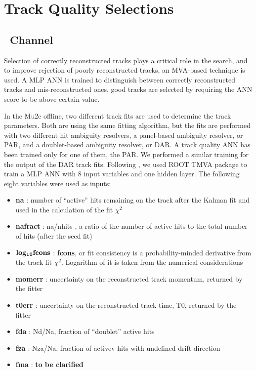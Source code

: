 

\section{Track Quality Selections}

\subsection{\MuToEm\  Channel}
\label{sec:mumem_channel}

Selection of correctly reconstructed tracks plays a critical role in the search, and 
to improve rejection of poorly reconstructed  tracks, an MVA-based technique is used.
A MLP ANN is trained to distinguish between correctly reconstructed tracks
and mis-reconstructed ones, good tracks are selected by requiring the ANN score to be
above certain value.

In the Mu2e offline, two different track fits are used to determine the track parameters.
Both are using the same fitting algorithm, but the fits are performed with two different
hit ambiguity resolvers, a panel-based ambiguity resolver, or PAR, and a doublet-based
ambiguity resolver, or DAR. A track quality ANN has been trained only for one of them,
the PAR. 
%
We performed a similar training for the output of the DAR track fits.
%
Following \cite{MU2E_4595_ANN_TRAINING}, we used ROOT TMVA package to train a MLP ANN
with 8 input variables and one hidden layer. The following eight variables were used
as inputs:

\begin{itemize}
\item
  {\bf na } : number of ``active'' hits remaining on the track after the Kalman fit and used
  in the calculation of the fit $\chi^2$
\item
  {\bf nafract} : na/nhits , a ratio of the number of active hits to the total number
  of hits (after the seed fit)
\item
  ${\bf log_{10}{fcons}}$ : {\bf fcons}, or fit consistency is a probability-minded derivative
  from the track fit $\chi^2$. Logarithm of it is taken from the numerical considerations
\item
  {\bf momerr} : uncertainty on the reconstructed track momentum, returned by the fitter
\item
  {\bf t0err} : uncertainty on the reconstructed track time, T0, returned by the fitter
\item
  {\bf fda} : Nd/Na, fraction of ``doublet'' active hits
\item
  {\bf fza } : Nza/Na, fraction of activev hits with undefined drift direction
\item
  {\bf fma } : {\bf \red to be clarified}
\end{itemize}

